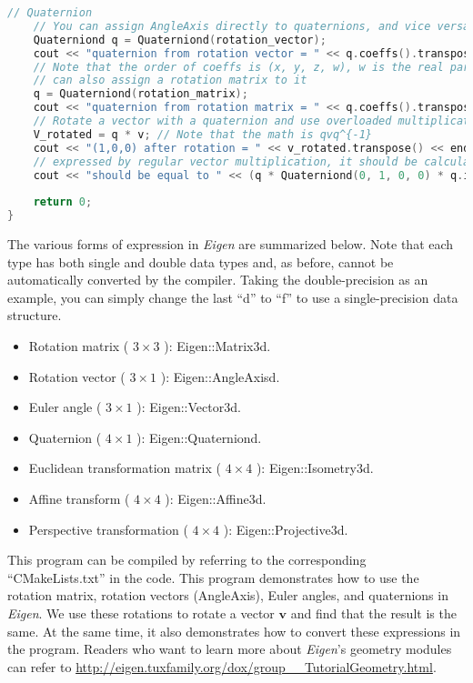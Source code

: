 \begin{lstlisting}[language=c++,caption=slambook2/ch3/useGeometry/useGeometry.cpp]
	// Quaternion
	// You can assign AngleAxis directly to quaternions, and vice versa
	Quaterniond q = Quaterniond(rotation_vector);
	cout << "quaternion from rotation vector = " << q.coeffs().transpose() << endl; 
	// Note that the order of coeffs is (x, y, z, w), w is the real part, the first three are the imaginary part
	// can also assign a rotation matrix to it
	q = Quaterniond(rotation_matrix);
	cout << "quaternion from rotation matrix = " << q.coeffs().transpose() << endl;
	// Rotate a vector with a quaternion and use overloaded multiplication
	V_rotated = q * v; // Note that the math is qvq^{-1}
	cout << "(1,0,0) after rotation = " << v_rotated.transpose() << endl;
	// expressed by regular vector multiplication, it should be calculated as follows
	cout << "should be equal to " << (q * Quaterniond(0, 1, 0, 0) * q.inverse()).coeffs().transpose() << endl;
	
	return 0;
}
\end{lstlisting}

The various forms of expression in \textit{Eigen} are summarized below. Note that each type has both single and double data types and, as before, cannot be automatically converted by the compiler. Taking the double-precision as an example, you can simply change the last ``d'' to ``f'' to use a single-precision data structure.
\begin{itemize}
	\item Rotation matrix ( $ 3  \times  3 $ ): Eigen::Matrix3d.
	\item Rotation vector ( $ 3  \times  1 $ ): Eigen::AngleAxisd.
	\item Euler angle ( $ 3  \times  1 $ ): Eigen::Vector3d.
	\item Quaternion ( $ 4  \times  1 $ ): Eigen::Quaterniond.
	\item Euclidean transformation matrix ( $ 4  \times  4 $ ): Eigen::Isometry3d.
	\item Affine transform ( $ 4  \times  4 $ ): Eigen::Affine3d.
	\item Perspective transformation ( $ 4  \times  4 $ ): Eigen::Projective3d.
\end{itemize}

This program can be compiled by referring to the corresponding ``CMakeLists.txt'' in the code. This program demonstrates how to use the rotation matrix, rotation vectors (AngleAxis), Euler angles, and quaternions in \textit{Eigen}. We use these rotations to rotate a vector $ \mathbf {v} $ and find that the result is the same. At the same time, it also demonstrates how to convert these expressions in the program. Readers who want to learn more about \textit{Eigen}'s geometry modules can refer to \url {http://eigen.tuxfamily.org/dox/group__TutorialGeometry.html}.

